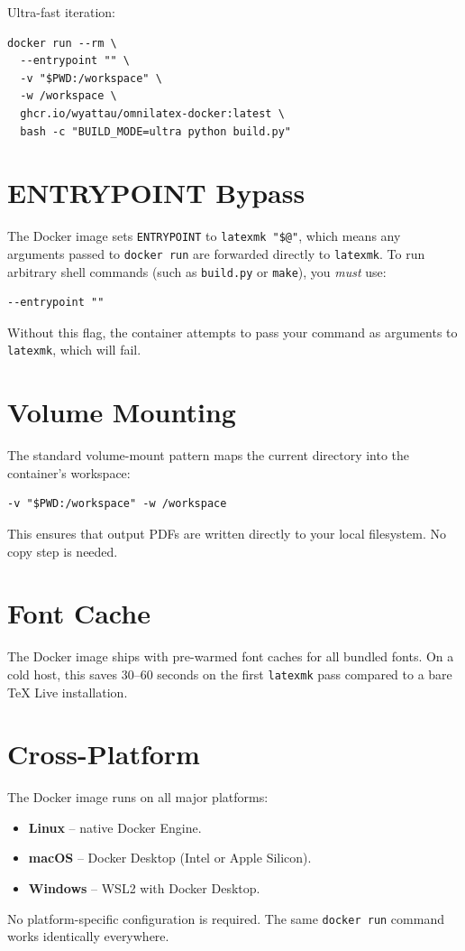 Ultra-fast iteration:

\begin{verbatim}
docker run --rm \
  --entrypoint "" \
  -v "$PWD:/workspace" \
  -w /workspace \
  ghcr.io/wyattau/omnilatex-docker:latest \
  bash -c "BUILD_MODE=ultra python build.py"
\end{verbatim}

\section{ENTRYPOINT Bypass}

The Docker image sets \texttt{ENTRYPOINT} to \texttt{latexmk "\$@"}, which
means any arguments passed to \texttt{docker run} are forwarded directly to
\texttt{latexmk}.  To run arbitrary shell commands (such as \texttt{build.py}
or \texttt{make}), you \emph{must} use:

\begin{verbatim}
--entrypoint ""
\end{verbatim}

Without this flag, the container attempts to pass your command as arguments
to \texttt{latexmk}, which will fail.

\section{Volume Mounting}

The standard volume-mount pattern maps the current directory into the
container's workspace:

\begin{verbatim}
-v "$PWD:/workspace" -w /workspace
\end{verbatim}

This ensures that output PDFs are written directly to your local filesystem.
No copy step is needed.

\section{Font Cache}

The Docker image ships with pre-warmed font caches for all bundled fonts.
On a cold host, this saves 30--60 seconds on the first \texttt{latexmk}
pass compared to a bare TeX Live installation.

\section{Cross-Platform}

The Docker image runs on all major platforms:

\begin{itemize}
  \item \textbf{Linux} -- native Docker Engine.
  \item \textbf{macOS} -- Docker Desktop (Intel or Apple Silicon).
  \item \textbf{Windows} -- WSL2 with Docker Desktop.
\end{itemize}

No platform-specific configuration is required.  The same
\texttt{docker run} command works identically everywhere.
